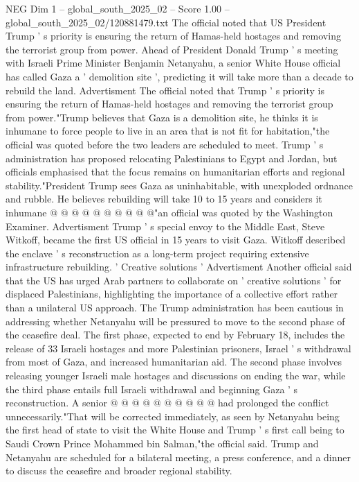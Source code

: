 \begin{textsample}{NEG Dim 1 – global\_south\_2025\_02 – Score 1.00 – global\_south\_2025\_02/120881479.txt}  \label{ex:f1_neg_094}
The official noted that US President Trump ' s priority is ensuring the return of Hamas-held hostages and removing the terrorist group from power.
Ahead of President Donald Trump ' s meeting with Israeli Prime Minister Benjamin Netanyahu, a senior White House official has called Gaza a ' demolition site ', predicting it will take more than a decade to rebuild the land.
Advertisment The official noted that Trump ' s priority is ensuring the return of Hamas-held hostages and removing the terrorist group from power."Trump believes that Gaza is a demolition site, he thinks it is inhumane to force people to live in an area that is not fit for habitation,"the official was quoted before the two leaders are scheduled to meet.
Trump ' s administration has proposed relocating Palestinians to Egypt and Jordan, but officials emphasised that the focus remains on humanitarian efforts and regional stability."President Trump sees Gaza as uninhabitable, with unexploded ordnance and rubble.
He believes rebuilding will take 10 to 15 years and considers it inhumane @ @ @ @ @ @ @ @ @ @"an official was quoted by the Washington Examiner.
Advertisment Trump ' s special envoy to the Middle East, Steve Witkoff, became the first US official in 15 years to visit Gaza.
Witkoff described the enclave ' s reconstruction as a long-term project requiring extensive infrastructure rebuilding. ' Creative solutions ' Advertisment Another official said that the US has urged Arab partners to collaborate on ' creative solutions ' for displaced Palestinians, highlighting the importance of a collective effort rather than a unilateral US approach.
The Trump administration has been cautious in addressing whether Netanyahu will be pressured to move to the second phase of the ceasefire deal.
The first phase, expected to end by February 18, includes the release of 33 Israeli hostages and more Palestinian prisoners, Israel ' s withdrawal from most of Gaza, and increased humanitarian aid.
The second phase involves releasing younger Israeli male hostages and discussions on ending the war, while the third phase entails full Israeli withdrawal and beginning Gaza ' s reconstruction.
A senior @ @ @ @ @ @ @ @ @ @ had prolonged the conflict unnecessarily."That will be corrected immediately, as seen by Netanyahu being the first head of state to visit the White House and Trump ' s first call being to Saudi Crown Prince Mohammed bin Salman,"the official said.
Trump and Netanyahu are scheduled for a bilateral meeting, a press conference, and a dinner to discuss the ceasefire and broader regional stability.

\end{textsample}
